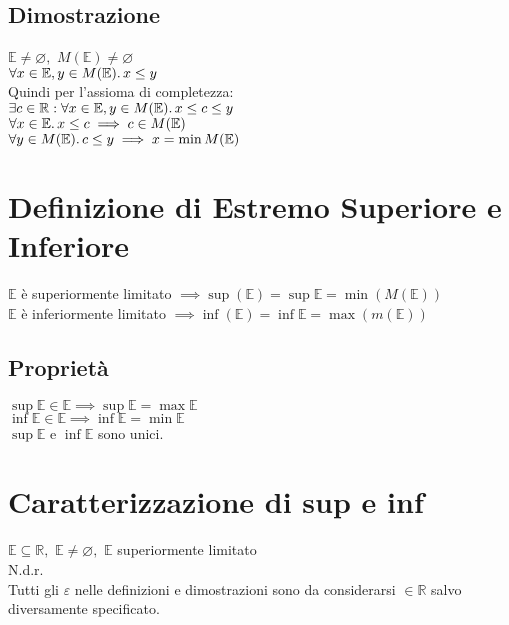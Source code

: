 \documentclass[a4paper, twoside, italian, 11pt]{book}
\newcommand{\R}{\mathbb{R}}
\newcommand{\E}{\mathbb{E}}
\let\emptyset\varnothing
\begin{document}
\subsection{Dimostrazione}

\noindent
$\E \neq \emptyset,$ $M(\E) \neq \emptyset$ \\

\noindent
$\forall x \in \E, y \in M(\E) \ldotp x \leq y$ \\

\noindent
Quindi per l'assioma di completezza: \\

\noindent
$\exists c \in \R : \forall x \in \E, y \in M(\E) \ldotp x \leq c \leq y$ \\

\noindent
$\forall x \in \E \ldotp x \leq c \implies c \in M(\E)$ \\
$\forall y \in M(\E) \ldotp c \leq y \implies x = \min M(\E)$



\section{Definizione di Estremo Superiore e Inferiore}

\noindent
$\E$ è superiormente limitato $\implies \sup(\E) = \sup \E = \min(M(\E))$ \\

\noindent
$\E$ è inferiormente limitato $\implies \inf(\E) = \inf \E = \max(m(\E))$


\subsection{Proprietà}

\noindent
$\sup \E \in \E \implies \sup \E = \max \E$ \\
$\inf \E \in \E \implies \inf \E = \min \E$ \\
$\sup \E$ e $\inf \E$ sono unici.



\section{Caratterizzazione di sup e inf}

\noindent
$\E \subseteq \R,$ $\E \neq \emptyset,$ $\E$ superiormente limitato \\

\noindent
N.d.r. \\
Tutti gli $\varepsilon$ nelle definizioni e dimostrazioni sono da considerarsi $\in \R$ salvo diversamente specificato.
\end{document}
